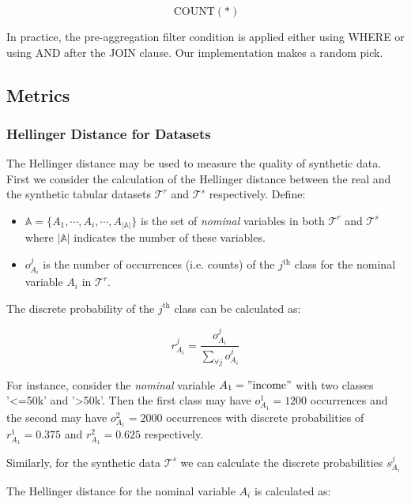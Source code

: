 \[\ \mathrm{COUNT(*)}\]

In practice, the pre-aggregation filter condition is applied either
using WHERE or using AND after the JOIN clause. Our implementation makes
a random pick.

\hypertarget{metrics}{%
\subsection{Metrics}\label{metrics}}

\hypertarget{hellinger-distance-for-datasets}{%
\subsubsection{Hellinger Distance for
Datasets}\label{hellinger-distance-for-datasets}}

The Hellinger distance may be used to measure the quality of synthetic
data. First we consider the calculation of the Hellinger distance
between the real and the synthetic tabular datasets \(\mathcal{T}^{r}\)
and \(\mathcal{T}^{s}\) respectively. Define:

\begin{itemize}
\item
  \(\mathbb{A} = \{ A_{1},\cdots,A_{i},\cdots,A_{|\mathbb{A}|}\}\) is
  the set of \emph{nominal} variables in both \(\mathcal{T}^{r}\) and
  \(\mathcal{T}^{s}\) where \(|\mathbb{A}|\) indicates the number of
  these variables.
\item
  \(o_{A_{i}}^{j}\) is the number of occurrences (i.e. counts) of the
  \(j^{\text{th}}\) class for the nominal variable \(A_{i}\) in
  \(\mathcal{T}^{r}\).
\end{itemize}

The discrete probability of the \(j^{\text{th}}\) class can be
calculated as:

\[r_{A_{i}}^{j} = \frac{o_{A_{i}}^{j}}{\sum_{\forall j}^{}o_{A_{i}}^{j}}\]

For instance, consider the \emph{nominal} variable
\(A_{1} = \mathrm{"income"}\) with two classes '\textless{}=50k' and
'\textgreater{}50k'. Then the first class may have
\(o_{A_{1}}^{1} = 1200\) occurrences and the second may have
\(o_{A_{1}}^{2} = 2000\) occurrences with discrete probabilities of
\(r_{A_{1}}^{1} = 0.375\) and \(r_{A_{1}}^{2} = 0.625\) respectively.

Similarly, for the synthetic data \(\mathcal{T}^{s}\) we can calculate
the discrete probabilities \(s_{A_{i}}^{j}\)

The Hellinger distance for the nominal variable \(A_{i}\) is calculated
as:

